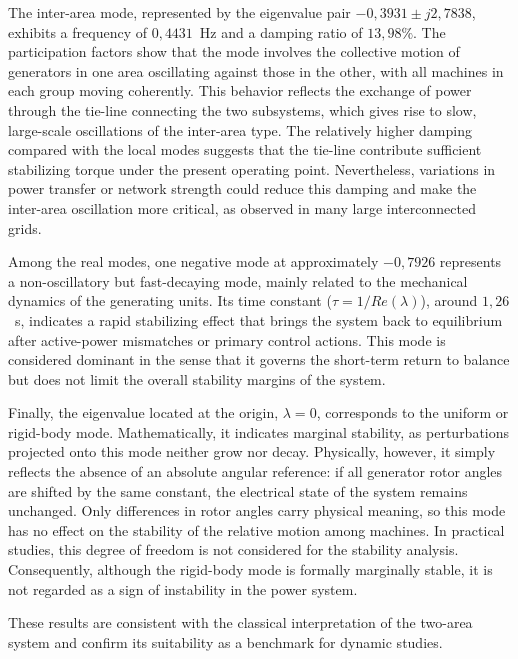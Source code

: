 The inter-area mode, represented by the eigenvalue pair $-0,3931 \pm j2,7838$, exhibits a frequency of  $0,4431$~Hz and a damping 
ratio of $13,98\%$. The participation factors show that the mode involves the collective motion of generators in one area oscillating 
against those in the other, with all machines in each group moving coherently. This behavior reflects the exchange of power 
through the tie-line connecting the two subsystems, which gives rise to slow, large-scale oscillations of the inter-area type. 
The relatively higher damping compared with the local modes suggests that the tie-line 
contribute sufficient stabilizing torque under the present operating point. Nevertheless, variations in power transfer or network 
strength could reduce this damping and make the inter-area oscillation more critical, as observed in many large interconnected grids.

Among the real modes, one negative mode at approximately $-0,7926$ represents a non-oscillatory but fast-decaying mode, 
mainly related to the mechanical dynamics of the generating units. Its time constant ($\tau = 1/Re(\lambda)$), around $1,26$~s, indicates a rapid stabilizing
effect that brings the system back to equilibrium after active-power mismatches or primary control actions. This mode is considered 
dominant in the sense that it governs the short-term return to balance but does not limit the overall stability margins of the system.

Finally, the eigenvalue located at the origin, $\lambda = 0$, corresponds to the uniform or rigid-body mode. 
Mathematically, it indicates marginal stability, as perturbations projected onto this mode neither grow nor decay.
Physically, however, it simply reflects the absence of an absolute angular reference: if all generator rotor angles are shifted by the same constant, 
the electrical state of the system remains unchanged. Only differences in rotor angles carry physical meaning, so this mode has no effect on the stability 
of the relative motion among machines. In practical studies, this degree of freedom is not considered for the stability analysis. 
Consequently, although the rigid-body mode is formally marginally stable, it is not regarded as a sign of instability in the power system.
 
These results are consistent with the classical interpretation of the two-area system and confirm its suitability as a benchmark
 for dynamic studies.



